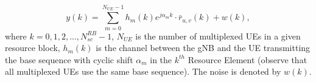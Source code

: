 \documentclass[journal]{IEEEtran}
\begin{document}
\begin{equation}
    y(k) = \sum_{m = 0}^{N_{UE}-1}h_{m}(k)e^{j\alpha_{m} k}\cdot\bar{r}_{u,v} (k) + w(k),
    \label{eq: pucch_rx_signal}
\end{equation}
where $k = 0,1,2,..., N_{sc}^{RB}-1$, $N_{UE}$ is the number of multiplexed UEs in a given resource block, $h_{m}(k)$ is the channel between the gNB and the UE transmitting the base sequence with cyclic shift $\alpha_m$ in the $k^{th}$ Resource Element (observe that all multiplexed UEs use the same base sequence). The noise is denoted by $w(k)$.





\end{document}
